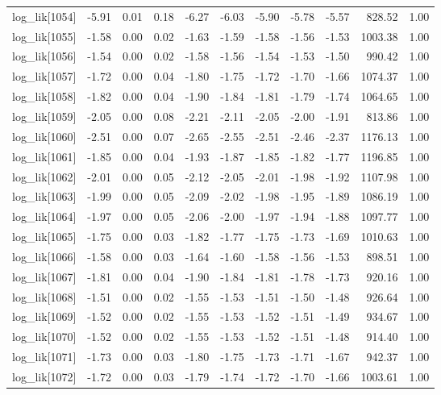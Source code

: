 \begin{table}[ht]
\begin{tabular}{rrrrrrrrrrr}
  log\_lik[1054] & -5.91 & 0.01 & 0.18 & -6.27 & -6.03 & -5.90 & -5.78 & -5.57 & 828.52 & 1.00 \\ 
  log\_lik[1055] & -1.58 & 0.00 & 0.02 & -1.63 & -1.59 & -1.58 & -1.56 & -1.53 & 1003.38 & 1.00 \\ 
  log\_lik[1056] & -1.54 & 0.00 & 0.02 & -1.58 & -1.56 & -1.54 & -1.53 & -1.50 & 990.42 & 1.00 \\ 
  log\_lik[1057] & -1.72 & 0.00 & 0.04 & -1.80 & -1.75 & -1.72 & -1.70 & -1.66 & 1074.37 & 1.00 \\ 
  log\_lik[1058] & -1.82 & 0.00 & 0.04 & -1.90 & -1.84 & -1.81 & -1.79 & -1.74 & 1064.65 & 1.00 \\ 
  log\_lik[1059] & -2.05 & 0.00 & 0.08 & -2.21 & -2.11 & -2.05 & -2.00 & -1.91 & 813.86 & 1.00 \\ 
  log\_lik[1060] & -2.51 & 0.00 & 0.07 & -2.65 & -2.55 & -2.51 & -2.46 & -2.37 & 1176.13 & 1.00 \\ 
  log\_lik[1061] & -1.85 & 0.00 & 0.04 & -1.93 & -1.87 & -1.85 & -1.82 & -1.77 & 1196.85 & 1.00 \\ 
  log\_lik[1062] & -2.01 & 0.00 & 0.05 & -2.12 & -2.05 & -2.01 & -1.98 & -1.92 & 1107.98 & 1.00 \\ 
  log\_lik[1063] & -1.99 & 0.00 & 0.05 & -2.09 & -2.02 & -1.98 & -1.95 & -1.89 & 1086.19 & 1.00 \\ 
  log\_lik[1064] & -1.97 & 0.00 & 0.05 & -2.06 & -2.00 & -1.97 & -1.94 & -1.88 & 1097.77 & 1.00 \\ 
  log\_lik[1065] & -1.75 & 0.00 & 0.03 & -1.82 & -1.77 & -1.75 & -1.73 & -1.69 & 1010.63 & 1.00 \\ 
  log\_lik[1066] & -1.58 & 0.00 & 0.03 & -1.64 & -1.60 & -1.58 & -1.56 & -1.53 & 898.51 & 1.00 \\ 
  log\_lik[1067] & -1.81 & 0.00 & 0.04 & -1.90 & -1.84 & -1.81 & -1.78 & -1.73 & 920.16 & 1.00 \\ 
  log\_lik[1068] & -1.51 & 0.00 & 0.02 & -1.55 & -1.53 & -1.51 & -1.50 & -1.48 & 926.64 & 1.00 \\ 
  log\_lik[1069] & -1.52 & 0.00 & 0.02 & -1.55 & -1.53 & -1.52 & -1.51 & -1.49 & 934.67 & 1.00 \\ 
  log\_lik[1070] & -1.52 & 0.00 & 0.02 & -1.55 & -1.53 & -1.52 & -1.51 & -1.48 & 914.40 & 1.00 \\ 
  log\_lik[1071] & -1.73 & 0.00 & 0.03 & -1.80 & -1.75 & -1.73 & -1.71 & -1.67 & 942.37 & 1.00 \\ 
  log\_lik[1072] & -1.72 & 0.00 & 0.03 & -1.79 & -1.74 & -1.72 & -1.70 & -1.66 & 1003.61 & 1.00 \\ 

\end{tabular}
\end{table}
